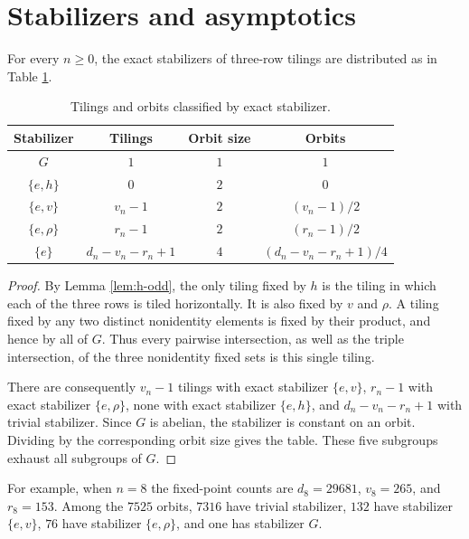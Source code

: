 \section{Stabilizers and asymptotics}\label{sec:types}

\begin{theorem}\label{thm:stabilizers}
For every $n\ge0$, the exact stabilizers of three-row tilings
are distributed as in Table \ref{tab:stabilizers}.
\end{theorem}

\begin{table}[htbp]
\centering
\caption{Tilings and orbits classified by exact stabilizer.}
\label{tab:stabilizers}
\begin{tabular}{cccc}
\toprule
Stabilizer & Tilings & Orbit size & Orbits\\
\midrule
$G$ & $1$ & $1$ & $1$\\
$\{e,h\}$ & $0$ & $2$ & $0$\\
$\{e,v\}$ & $v_n-1$ & $2$ & $(v_n-1)/2$\\
$\{e,\rho\}$ & $r_n-1$ & $2$ & $(r_n-1)/2$\\
$\{e\}$ & $d_n-v_n-r_n+1$ & $4$ & $(d_n-v_n-r_n+1)/4$\\
\bottomrule
\end{tabular}
\end{table}

\begin{proof}
By Lemma \ref{lem:h-odd}, the only tiling fixed by $h$ is the
tiling in which each of the three rows is tiled horizontally.
It is also fixed by $v$ and $\rho$.
A tiling fixed by any two distinct nonidentity elements is
fixed by their product, and hence by all of $G$.
Thus every pairwise intersection, as well as the triple
intersection, of the three nonidentity fixed sets is this
single tiling.

There are consequently $v_n-1$ tilings with exact stabilizer
$\{e,v\}$, $r_n-1$ with exact stabilizer $\{e,\rho\}$, none with
exact stabilizer $\{e,h\}$, and $d_n-v_n-r_n+1$ with trivial
stabilizer. Since $G$ is abelian, the stabilizer is constant
on an orbit. Dividing by the corresponding orbit size gives
the table. These five subgroups exhaust all subgroups of $G$.
\end{proof}

For example, when $n=8$ the fixed-point counts are
$d_8=29681$, $v_8=265$, and $r_8=153$.
Among the $7525$ orbits, $7316$ have trivial stabilizer,
$132$ have stabilizer $\{e,v\}$, $76$ have stabilizer
$\{e,\rho\}$, and one has stabilizer $G$.

